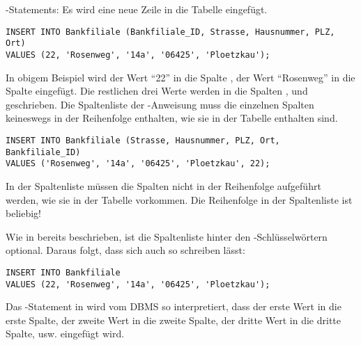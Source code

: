         \INSERT-Statements: Es wird eine neue Zeile in die Tabelle
         eingefügt.
        \begin{lstlisting}[language=oracle_sql,caption={Ein einfaches INSERT},label=sql07_02]
INSERT INTO Bankfiliale (Bankfiliale_ID, Strasse, Hausnummer, PLZ, Ort)
VALUES (22, 'Rosenweg', '14a', '06425', 'Ploetzkau');
        \end{lstlisting}
\clearpage
        In obigem Beispiel wird der Wert \enquote{22} in die Spalte
        , der Wert \enquote{Rosenweg} in die Spalte
         eingefügt. Die restlichen drei Werte werden in
        die Spalten ,  und
         geschrieben.
        Die Spaltenliste der \INSERT-Anweisung muss die einzelnen Spalten keineswegs in der Reihenfolge enthalten, wie sie in der Tabelle enthalten sind.
        \begin{lstlisting}[language=oracle_sql,caption={Ein einfaches INSERT},label=sql07_03]
INSERT INTO Bankfiliale (Strasse, Hausnummer, PLZ, Ort, Bankfiliale_ID)
VALUES ('Rosenweg', '14a', '06425', 'Ploetzkau', 22);
        \end{lstlisting}
        \begin{merke}
          In der Spaltenliste müssen die Spalten nicht in der Reihenfolge
          aufgeführt werden, wie sie in der Tabelle vorkommen. Die Reihenfolge
          in der Spaltenliste ist beliebig!
        \end{merke}
        \vspace{1em}
        Wie in  bereits beschrieben, ist die Spaltenliste
        hinter den -Schlüssel\-wörtern optional.
        Daraus folgt, dass sich  auch so schreiben lässt:
        \begin{lstlisting}[language=oracle_sql,caption={Ein einfaches INSERT ohne Spaltenliste},label=sql07_04]
INSERT INTO Bankfiliale
VALUES (22, 'Rosenweg', '14a', '06425', 'Ploetzkau');
        \end{lstlisting}
        Das \INSERT-Statement in  wird vom DBMS so
        interpretiert, dass der erste Wert in die erste Spalte, der zweite Wert
        in die zweite Spalte, der dritte Wert in die dritte Spalte, usw.
        eingefügt wird.
